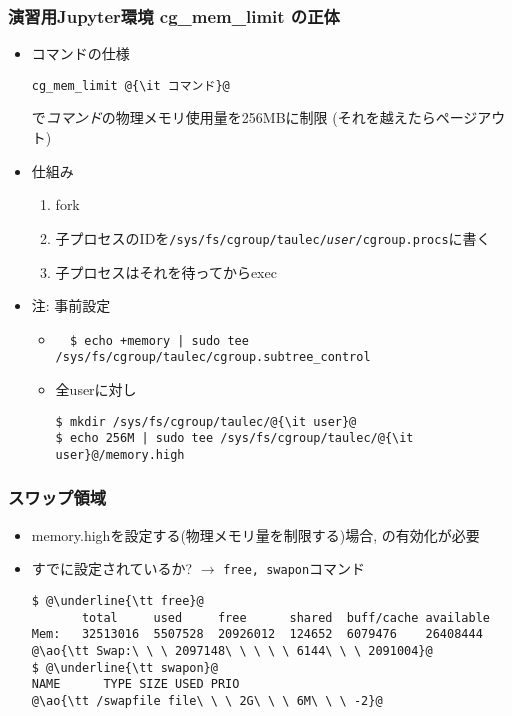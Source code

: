 \documentclass[12pt,dvipdfmx]{beamer}
\begin{document}
\begin{frame}[fragile]
  \frametitle{演習用Jupyter環境 cg\_mem\_limit の正体}
  \begin{itemize}
  \item コマンドの仕様
\begin{lstlisting}
cg_mem_limit @{\it コマンド}@      
\end{lstlisting}
で{\it コマンド}の物理メモリ使用量を256MBに制限 (それを越えたらページアウト)
\item 仕組み
  \begin{enumerate}
  \item fork
  \item 子プロセスのIDを{\tt /sys/fs/cgroup/taulec/{\it user}/cgroup.procs}に書く
  \item 子プロセスはそれを待ってからexec
  \end{enumerate}
\item 注: 事前設定
  \begin{itemize}
  \item []
\begin{lstlisting}
  $ echo +memory | sudo tee /sys/fs/cgroup/taulec/cgroup.subtree_control
\end{lstlisting}%
\item 全userに対し
\begin{lstlisting}
$ mkdir /sys/fs/cgroup/taulec/@{\it user}@
$ echo 256M | sudo tee /sys/fs/cgroup/taulec/@{\it user}@/memory.high
\end{lstlisting}%
\end{itemize}
\end{itemize}
\end{frame}

\begin{frame}[fragile]
  \frametitle{スワップ領域}
  \begin{itemize}
  \item memory.highを設定する(物理メモリ量を制限する)場合,
    の有効化が必要
  \item すでに設定されているか? $\rightarrow$ {\tt free, swapon}コマンド
\begin{lstlisting}
$ @\underline{\tt free}@
       total     used     free      shared  buff/cache available
Mem:   32513016  5507528  20926012  124652  6079476    26408444
@\ao{\tt Swap:\ \ \ 2097148\ \ \ \ \ 6144\ \ \ 2091004}@
$ @\underline{\tt swapon}@
NAME      TYPE SIZE USED PRIO
@\ao{\tt /swapfile file\ \ \ 2G\ \ \ 6M\ \ \ -2}@
\end{lstlisting} %
\end{itemize}
\end{frame}
\end{document}
